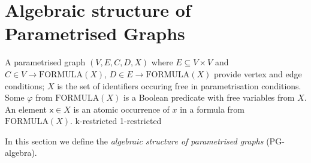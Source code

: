 \section{Algebraic structure of Parametrised Graphs\label{sec:Algebra-of-parametrised}}

A parametrised graph $(V, E, C, D, X)$
where $E \subseteq V \times V$ and $C \in V \rightarrow \mathrm{FORMULA}(X)$, $D \in E \rightarrow \mathrm{FORMULA}(X)$ provide vertex and edge conditions; $X$ is the set of identifiers occuring free in parametrisation conditions. Some $\varphi$ from $\mathrm{FORMULA}(X)$ is a Boolean predicate with free variables from $X$. An element $\mathsf{x} \in X$ is an atomic occurrence of $x$ in a formula from $\mathrm{FORMULA}(X)$.  
k-restricted
1-restricted


In this section we define the \emph{algebraic structure of parametrised graphs}
(PG-algebra).

